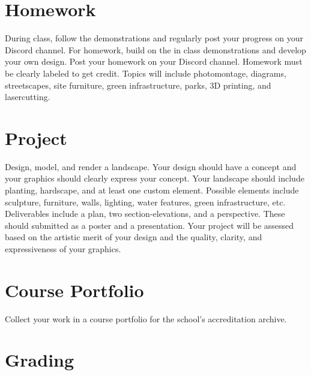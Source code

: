 \documentclass[11pt,article,oneside]{memoir}
\begin{document}
\section{Homework}

During class, follow the demonstrations 
and regularly post your progress on your Discord channel. 
For homework, 
build on the in class demonstrations 
and develop your own design.
Post your homework on your Discord channel. 
Homework must be clearly labeled to get credit.
Topics will include 
photomontage, 
diagrams,
streetscapes,
site furniture,
green infrastructure,
parks, 
3D printing, 
and lasercutting.
\\

\section{Project}

Design, model, and render
a landscape. 
Your design should have a concept
and your graphics should clearly express your concept.
Your landscape should include 
planting, hardscape, and at least one custom element.
Possible elements include sculpture, furniture, walls, lighting, 
water features, green infrastructure, etc. 
Deliverables include a plan, two section-elevations, and a perspective.
These should submitted as a poster and a presentation.
Your project will be assessed based on
the artistic merit of your design
and the quality, clarity, and expressiveness
of your graphics. 
\\


\section{Course Portfolio}

Collect your work in a course portfolio
for the school's accreditation archive.
\\

\section{Grading}
\end{document}
